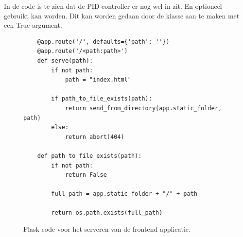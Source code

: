 In de code is te zien dat de PID-controller er nog wel in zit. En optioneel gebruikt kan worden. Dit kan worden gedaan door de  klasse aan te maken met een True argument.\\

\begin{figure}[H]
    \centering
    \begin{verbatim}
    @app.route('/', defaults={'path': ''})
    @app.route('/<path:path>')
    def serve(path):
        if not path:
            path = "index.html"
    
        if path_to_file_exists(path):
            return send_from_directory(app.static_folder, path)
        else:
            return abort(404)
            
    def path_to_file_exists(path):
        if not path:
            return False
            
        full_path = app.static_folder + "/" + path
        
        return os.path.exists(full_path)
    \end{verbatim}
    \caption{Flask code voor het serveren van de frontend applicatie.}
    \label{fig:frontend}
\end{figure}

